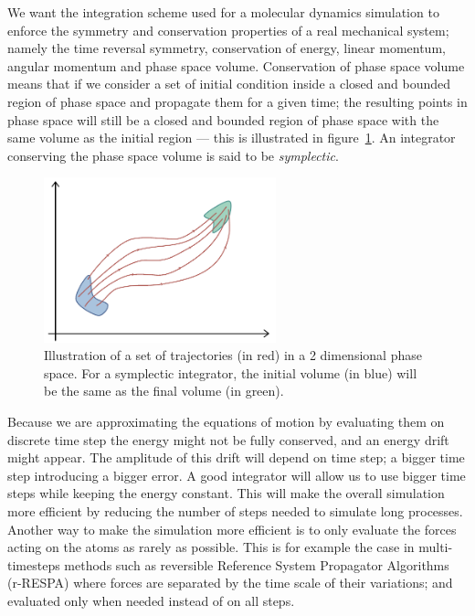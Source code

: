 \documentclass[thesis]{subfiles}
\begin{document}
We want the integration scheme used for a molecular dynamics simulation to
enforce the symmetry and conservation properties of a real mechanical system;
namely the time reversal symmetry, conservation of energy, linear momentum,
angular momentum and phase space volume. Conservation of phase space volume
means that if we consider a set of initial condition inside a closed and bounded
region of phase space and propagate them for a given time; the resulting points
in phase space will still be a closed and bounded region of phase space with the
same volume as the initial region --- this is illustrated in
figure~\ref{fig:symplectic-integrator}. An integrator conserving the phase space
volume is said to be \emph{symplectic}.

\begin{figure}[ht]
    \centering
    \includegraphics[width=0.6\textwidth]{figures/images/symplectic-integrator}
    \caption{Illustration of a set of trajectories (in red) in a 2 dimensional
    phase space. For a symplectic integrator, the initial volume (in blue) will
    be the same as the final volume (in green).}
    \label{fig:symplectic-integrator}
\end{figure}

Because we are approximating the equations of motion by evaluating them on
discrete time step the energy might not be fully conserved, and an energy drift
might appear. The amplitude of this drift will depend on time step; a bigger
time step introducing a bigger error. A good integrator will allow us to use
bigger time steps while keeping the energy constant. This will make the overall
simulation more efficient by reducing the number of steps needed to simulate
long processes. Another way to make the simulation more efficient is to only
evaluate the forces acting on the atoms as rarely as possible. This is for
example the case in multi-timesteps methods such as reversible Reference System
Propagator Algorithms\cite{Tuckerman1992} (r-RESPA) where forces are separated
by the time scale of their variations; and evaluated only when needed instead of
on all steps.
\end{document}
